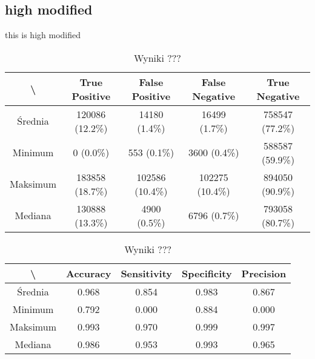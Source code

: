 \subsection{high modified}
this is high modified

\begin{table}[H]
	\centering
	\caption{Wyniki ???}
	\vspace{6pt}
	{\footnotesize
		\begin{tabular}{|c|c|c|c|c|}
      \hline \textbackslash & True Positive & False Positive & False Negative & True Negative \\
      \hline Średnia & 120086 (12.2\%) & 14180 (1.4\%) & 16499 (1.7\%) & 758547 (77.2\%) \\
      \hline Minimum & 0 (0.0\%) & 553 (0.1\%) & 3600 (0.4\%) & 588587 (59.9\%) \\
      \hline Maksimum & 183858 (18.7\%) & 102586 (10.4\%) & 102275 (10.4\%) & 894050 (90.9\%) \\
      \hline Mediana & 130888 (13.3\%) & 4900 (0.5\%) & 6796 (0.7\%) & 793058 (80.7\%) \\
      \hline
		\end{tabular}
	}
	\vspace{0pt}
\end{table}


\begin{table}[H]
	\centering
	\caption{Wyniki ???}
	\vspace{6pt}
	{\footnotesize
		\begin{tabular}{|c|c|c|c|c|}
      \hline \textbackslash & Accuracy & Sensitivity & Specificity & Precision \\
      \hline Średnia & 0.968 & 0.854 & 0.983 & 0.867 \\
      \hline Minimum & 0.792 & 0.000 & 0.884 & 0.000 \\
      \hline Maksimum & 0.993 & 0.970 & 0.999 & 0.997 \\
      \hline Mediana & 0.986 & 0.953 & 0.993 & 0.965 \\
      \hline
		\end{tabular}
	}
	\vspace{0pt}
\end{table}




